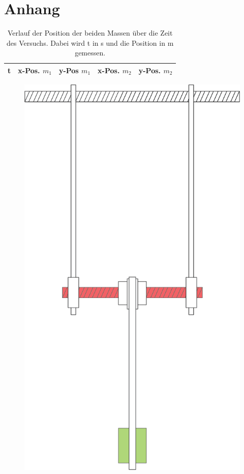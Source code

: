 \section{Anhang}
\nopagebreak
\begin{table}[h]
\scriptsize
\centering
\begin{tabular}{rllll}
t & x-Pos. $m_1$ & y-Pos $m_1$ & x-Pos. $m_2$ & y-Pos. $m_2$ \\
\toprule
\end{tabular}
\normalsize
\caption{Verlauf der Position der beiden Massen über die Zeit des Versuchs. Dabei wird t in s und die Position in m gemessen.}
\label{xy-table}
\end{table}


\begin{figure}
\centering
\includegraphics[width=.6\textwidth]{images/pendel-skizze.png}
\label{pic:skizze_versuchsaufbau}
\end{figure}